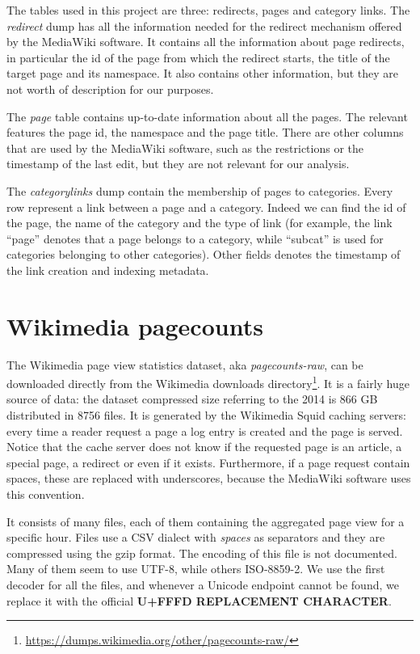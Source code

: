 The tables used in this project are three: redirects, pages and category links.
The \emph{redirect} dump has all the information needed for the redirect mechanism offered by the MediaWiki software.
It contains all the information about page redirects, in particular the id of the page from which the redirect starts, the title of the target page and its namespace.
It also contains other information, but they are not worth of description for our purposes.

The \emph{page} table contains up-to-date information about all the pages.
The relevant features the page id, the namespace and the page title.
There are other columns that are used by the MediaWiki software, such as the restrictions or the timestamp of the last edit, but they are not relevant for our analysis.

The \emph{categorylinks} dump contain the membership of pages to categories.
Every row represent a link between a page and a category.
Indeed we can find the id of the page, the name of the category and the type of link (for example, the link ``page'' denotes that a page belongs to a category, while ``subcat'' is used for categories belonging to other categories).
Other fields denotes the timestamp of the link creation and indexing metadata.

\section{Wikimedia pagecounts}
The Wikimedia page view statistics dataset, aka \emph{pagecounts-raw}, can be downloaded directly from the Wikimedia downloads directory\footnote{\url{https://dumps.wikimedia.org/other/pagecounts-raw/}}.
It is a fairly huge source of data: the dataset compressed size referring to the 2014 is 866 GB distributed in 8756 files.
It is generated by the Wikimedia Squid caching servers: every time a reader request a page a log entry is created and the page is served.
Notice that the cache server does not know if the requested page is an article, a special page, a redirect or even if it exists.
Furthermore, if a page request contain spaces, these are replaced with underscores, because the MediaWiki software uses this convention.

It consists of many files, each of them containing the aggregated page view for a specific hour.
Files use a CSV dialect with \emph{spaces} as separators and they are compressed using the gzip format.
The encoding of this file is not documented.
Many of them seem to use UTF-8, while others ISO-8859-2. %
We use the first decoder for all the files, and whenever a Unicode endpoint cannot be found, we replace it with the official \textbf{U+FFFD REPLACEMENT CHARACTER}.

